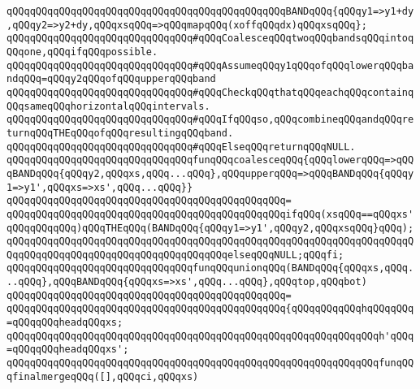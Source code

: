 \verb|qQQqqQQqqQQqqQQqqQQqqQQqqQQqqQQqqQQqqQQqqQQqqQQqBANDqQQq{qQQqy1=>y1+dy,qQQqy2=>y2+dy,qQQqxsqQQq=>qQQqmapqQQq(xoffqQQqdx)qQQqxsqQQq};|\newline
\newline
\newline
\newline
\verb|qQQqqQQqqQQqqQQqqQQqqQQqqQQqqQQq#qQQqCoalesceqQQqtwoqQQqbandsqQQqintoqQQqone,qQQqifqQQqpossible.|\newline
\verb|qQQqqQQqqQQqqQQqqQQqqQQqqQQqqQQq#qQQqAssumeqQQqy1qQQqofqQQqlowerqQQqbandqQQq=qQQqy2qQQqofqQQqupperqQQqband|\newline
\verb|qQQqqQQqqQQqqQQqqQQqqQQqqQQqqQQq#qQQqCheckqQQqthatqQQqeachqQQqcontainqQQqsameqQQqhorizontalqQQqintervals.|\newline
\verb|qQQqqQQqqQQqqQQqqQQqqQQqqQQqqQQq#qQQqIfqQQqso,qQQqcombineqQQqandqQQqreturnqQQqTHEqQQqofqQQqresultingqQQqband.|\newline
\verb|qQQqqQQqqQQqqQQqqQQqqQQqqQQqqQQq#qQQqElseqQQqreturnqQQqNULL.|\newline
\newline
\verb|qQQqqQQqqQQqqQQqqQQqqQQqqQQqqQQqfunqQQqcoalesceqQQq{qQQqlowerqQQq=>qQQqBANDqQQq{qQQqy2,qQQqxs,qQQq...qQQq},qQQqupperqQQq=>qQQqBANDqQQq{qQQqy1=>y1',qQQqxs=>xs',qQQq...qQQq}}|\newline
\verb|qQQqqQQqqQQqqQQqqQQqqQQqqQQqqQQqqQQqqQQqqQQqqQQq=|\newline
\verb|qQQqqQQqqQQqqQQqqQQqqQQqqQQqqQQqqQQqqQQqqQQqqQQqifqQQq(xsqQQq==qQQqxs'qQQqqQQqqQQq)qQQqTHEqQQq(BANDqQQq{qQQqy1=>y1',qQQqy2,qQQqxsqQQq}qQQq);|\newline
\verb|qQQqqQQqqQQqqQQqqQQqqQQqqQQqqQQqqQQqqQQqqQQqqQQqqQQqqQQqqQQqqQQqqQQqqQQqqQQqqQQqqQQqqQQqqQQqqQQqqQQqqQQqqQQqelseqQQqNULL;qQQqfi;|\newline
\newline
\verb|qQQqqQQqqQQqqQQqqQQqqQQqqQQqqQQqfunqQQqunionqQQq(BANDqQQq{qQQqxs,qQQq...qQQq},qQQqBANDqQQq{qQQqxs=>xs',qQQq...qQQq},qQQqtop,qQQqbot)|\newline
\verb|qQQqqQQqqQQqqQQqqQQqqQQqqQQqqQQqqQQqqQQqqQQqqQQq=|\newline
\verb|qQQqqQQqqQQqqQQqqQQqqQQqqQQqqQQqqQQqqQQqqQQqqQQq{qQQqqQQqqQQqhqQQqqQQq=qQQqqQQqheadqQQqxs;|\newline
\verb|qQQqqQQqqQQqqQQqqQQqqQQqqQQqqQQqqQQqqQQqqQQqqQQqqQQqqQQqqQQqqQQqh'qQQq=qQQqqQQqheadqQQqxs';|\newline
\newline
\verb|qQQqqQQqqQQqqQQqqQQqqQQqqQQqqQQqqQQqqQQqqQQqqQQqqQQqqQQqqQQqqQQqfunqQQqfinalmergeqQQq([],qQQqci,qQQqxs)|\newline
